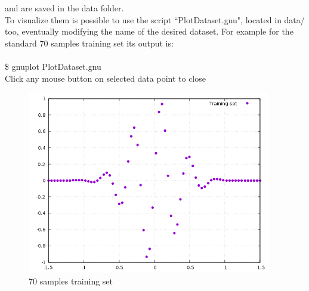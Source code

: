 \documentclass[12pt, a4paper]{report}
\theoremstyle{definition}
\begin{document}
and are saved in the data folder.\\
To visualize them is possible to use the \cite{gnuplot} script ``PlotDataset.gnu", located in data/ too, eventually modifying the name of the desired dataset. For example for the standard 70 samples training set its output is:\\
{\\ \ttfamily \$ gnuplot PlotDataset.gnu\\
Click any mouse button on selected data point to close}
\begin{figure}[H]
	\centering
	\includegraphics[width=0.95\textwidth]{img/TrainingSet70}
	\caption{70 samples training set}
\end{figure}
\newpage
\end{document}

